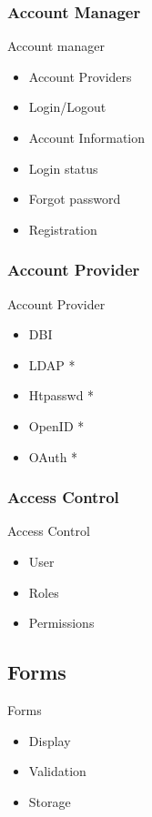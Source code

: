 \subsubsection{Account Manager}
\begin{frame}{Account manager}
\begin{itemize}
\item Account Providers
\item Login/Logout
\item Account Information
\item Login status
\item Forgot password
\item Registration
\end{itemize}
\end{frame}

\subsubsection{Account Provider}
\begin{frame}{Account Provider}
\begin{itemize}
\item DBI 
\item LDAP *
\item Htpasswd * 
\item OpenID *
\item OAuth *
\end{itemize}
\end{frame}

\subsubsection{Access Control}
\begin{frame}{Access Control}
\begin{itemize}
\item User
\item Roles
\item Permissions
\end{itemize}
\end{frame}

\subsection{Forms}
\begin{frame}{Forms}
\begin{itemize}
\item Display
\item Validation
\item Storage
\end{itemize}
\end{frame}

